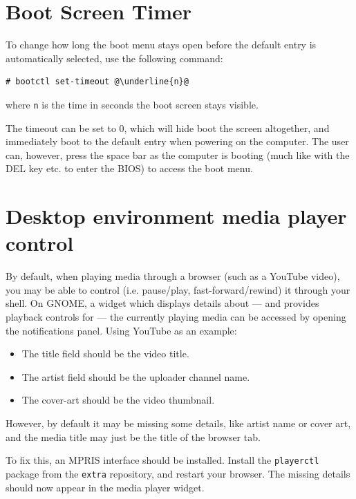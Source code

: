 \documentclass[a4paper]{article}
\begin{document}
\section{Boot Screen Timer}

To change how long the boot menu stays open before the default entry is automatically selected, use the following command:
\begin{lstlisting}[escapechar=@]
# bootctl set-timeout @\underline{n}@
\end{lstlisting}
where \lstinline|n| is the time in seconds the boot screen stays visible.

The timeout can be set to 0, which will hide boot the screen altogether, and immediately boot to the default entry when powering on the computer.
The user can, however, press the space bar as the computer is booting (much like with the DEL key etc. to enter the BIOS) to access the boot menu.

\section{Desktop environment media player control}

By default, when playing media through a browser (such as a YouTube video), you may be able to control (i.e. pause/play, fast-forward/rewind) it through your shell. 
On GNOME, a widget which displays details about --- and provides playback controls for --- the currently playing media can be accessed by opening the notifications panel.
Using YouTube as an example:
\begin{itemize}
    \item The title field should be the video title.
    \item The artist field should be the uploader channel name.
    \item The cover-art should be the video thumbnail. 
\end{itemize}
However, by default it may be missing some details, like artist name or cover art, and the media title may just be the title of the browser tab.

To fix this, an MPRIS interface should be installed.
Install the \lstinline|playerctl| package from the \lstinline|extra| repository, and restart your browser.
The missing details should now appear in the media player widget.







\end{document}
